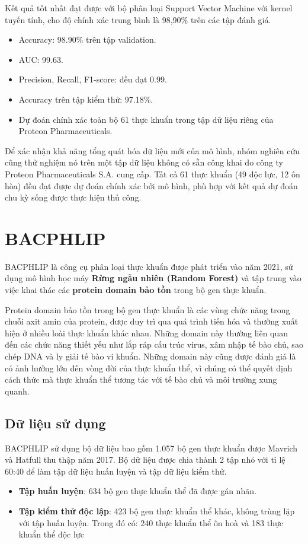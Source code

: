 Kết quả tốt nhất đạt được với bộ phân loại Support Vector Machine với kernel tuyến tính, cho độ chính xác trung bình là 98,90\% trên các tập đánh giá.
    \begin{itemize}
        \item Accuracy: 98.90\% trên tập validation.
        \item AUC: 99.63.
        \item Precision, Recall, F1-score: đều đạt 0.99.
        \item Accuracy trên tập kiểm thử: 97.18\%.
        \item Dự đoán chính xác toàn bộ 61 thực khuẩn trong tập dữ liệu riêng của Proteon Pharmaceuticals.
    \end{itemize}

Để xác nhận khả năng tổng quát hóa dữ liệu mới của mô hình, nhóm nghiên cứu cũng thử nghiệm nó trên một tập dữ liệu không có sẵn công khai do công ty Proteon Pharmaceuticals S.A. cung cấp. Tất cả 61 thực khuẩn (49 độc lực, 12 ôn hòa) đều đạt được dự đoán chính xác bởi mô hình, phù hợp với kết quả dự đoán chu kỳ sống được thực hiện thủ công.

\section{BACPHLIP}

BACPHLIP \cite{hockenberry2021bacphlip} là công cụ phân loại thực khuẩn được phát triển vào năm 2021, sử dụng mô hình học máy \textbf{Rừng ngẫu nhiên (Random Forest)} và tập trung vào việc khai thác các \textbf{protein domain bảo tồn} trong bộ gen thực khuẩn. 

Protein domain bảo tồn trong bộ gen thực khuẩn là các vùng chức năng trong chuỗi axit amin của protein, được duy trì qua quá trình tiến hóa và thường xuất hiện ở nhiều loài thực khuẩn khác nhau. Những domain này thường liên quan đến các chức năng thiết yếu như lắp ráp cấu trúc virus, xâm nhập tế bào chủ, sao chép DNA và ly giải tế bào vi khuẩn. Những domain này cũng được đánh giá là có ảnh hưởng lớn đến vòng đời của thực khuẩn thể, vì chúng có thể quyết định cách thức mà thực khuẩn thể tương tác với tế bào chủ và môi trường xung quanh.


\subsection*{Dữ liệu sử dụng}
BACPHLIP sử dụng bộ dữ liệu bao gồm 1.057 bộ gen thực khuẩn được Mavrich và Hatfull thu thập năm 2017. Bộ dữ liệu được chia thành 2 tập nhỏ với tỉ lệ 60:40 để làm tập dữ liệu huấn luyện và tập dữ liệu kiểm thử. 
\begin{itemize}
    \item \textbf{Tập huấn luyện}: 634 bộ gen thực khuẩn thể đã được gán nhãn.
    \item \textbf{Tập kiểm thử độc lập}: 423 bộ gen thực khuẩn thể khác, không trùng lặp với tập huấn luyện. Trong đó có: 240 thực khuẩn thể ôn hoà và 183 thực khuẩn thể độc lực
\end{itemize}

